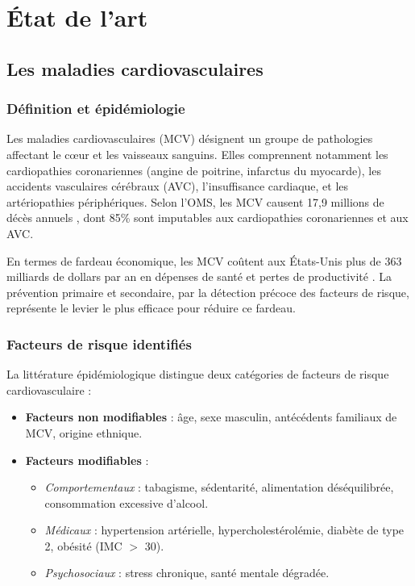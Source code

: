 \chapter{État de l'art}

\section{Les maladies cardiovasculaires}

\subsection{Définition et épidémiologie}

Les maladies cardiovasculaires (MCV) désignent un groupe de pathologies affectant le cœur et les vaisseaux sanguins. Elles comprennent notamment les cardiopathies coronariennes (angine de poitrine, infarctus du myocarde), les accidents vasculaires cérébraux (AVC), l'insuffisance cardiaque, et les artériopathies périphériques. Selon l'OMS, les MCV causent 17,9 millions de décès annuels \cite{who2023}, dont 85\% sont imputables aux cardiopathies coronariennes et aux AVC.

En termes de fardeau économique, les MCV coûtent aux États-Unis plus de 363 milliards de dollars par an en dépenses de santé et pertes de productivité \cite{virani2021}. La prévention primaire et secondaire, par la détection précoce des facteurs de risque, représente le levier le plus efficace pour réduire ce fardeau.

\subsection{Facteurs de risque identifiés}

La littérature épidémiologique distingue deux catégories de facteurs de risque cardiovasculaire \cite{roth2020} :

\begin{itemize}
    \item \textbf{Facteurs non modifiables} : âge, sexe masculin, antécédents familiaux de MCV, origine ethnique.
    \item \textbf{Facteurs modifiables} :
    \begin{itemize}
        \item \textit{Comportementaux} : tabagisme, sédentarité, alimentation déséquilibrée, consommation excessive d'alcool.
        \item \textit{Médicaux} : hypertension artérielle, hypercholestérolémie, diabète de type 2, obésité (IMC $>$ 30).
        \item \textit{Psychosociaux} : stress chronique, santé mentale dégradée.
    \end{itemize}
\end{itemize}

